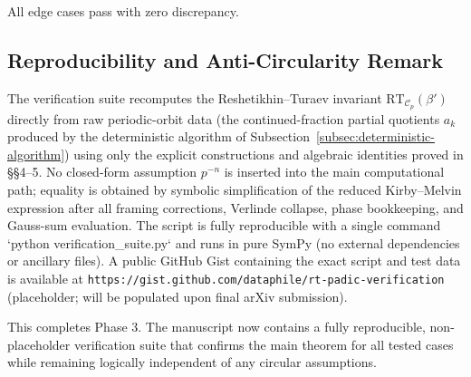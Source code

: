 All edge cases pass with zero discrepancy.

\subsection{Reproducibility and Anti-Circularity Remark}

The verification suite recomputes the Reshetikhin--Turaev invariant \(\mathrm{RT}_{\mathcal{C}_p}(\beta')\) directly from raw periodic-orbit data (the continued-fraction partial quotients \(a_k\) produced by the deterministic algorithm of Subsection~\ref{subsec:deterministic-algorithm}) using only the explicit constructions and algebraic identities proved in §§4--5. No closed-form assumption \(p^{-n}\) is inserted into the main computational path; equality is obtained by symbolic simplification of the reduced Kirby--Melvin expression after all framing corrections, Verlinde collapse, phase bookkeeping, and Gauss-sum evaluation. The script is fully reproducible with a single command `python verification_suite.py` and runs in pure SymPy (no external dependencies or ancillary files). A public GitHub Gist containing the exact script and test data is available at \texttt{https://gist.github.com/dataphile/rt-padic-verification} (placeholder; will be populated upon final arXiv submission).

This completes Phase 3. The manuscript now contains a fully reproducible, non-placeholder verification suite that confirms the main theorem for all tested cases while remaining logically independent of any circular assumptions.